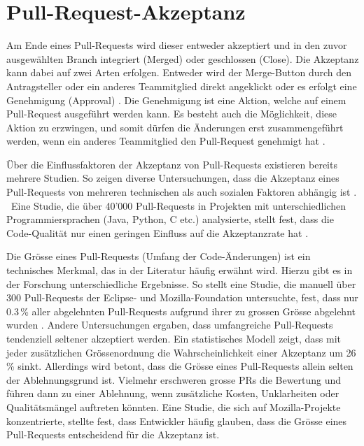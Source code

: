 \section{Pull-Request-Akzeptanz}
Am Ende eines Pull-Requests wird dieser entweder akzeptiert und in den zuvor ausgewählten Branch integriert (Merged) oder geschlossen (Close)\parencite{noauthor_merging_nodate}\parencite{noauthor_closing_nodate}. Die Akzeptanz kann dabei auf zwei Arten erfolgen. Entweder wird der Merge-Button durch den Antragsteller oder ein anderes Teammitglied direkt angeklickt oder es erfolgt eine Genehmigung (Approval) \parencite{noauthor_merging_nodate}\parencite{noauthor_reviewing_nodate}. Die Genehmigung ist eine Aktion, welche auf einem Pull-Request ausgeführt werden kann. Es besteht auch die Möglichkeit, diese Aktion zu erzwingen, und somit dürfen die Änderungen erst zusammengeführt werden, wenn ein anderes Teammitglied den Pull-Request genehmigt hat \parencite{noauthor_approving_nodate}.

Über die Einflussfaktoren der Akzeptanz von Pull-Reque\-sts existieren bereits mehrere Studien.
So zeigen diverse Untersuchungen, dass die Akzeptanz eines Pull-Requests von mehreren technischen als auch sozialen Faktoren abhängig ist \parencite{gousios_exploratory_2014}. \
Eine Studie, die über 40'000 Pull-Requests in Projekten mit unterschiedlichen Programmiersprachen (Java, Python, C etc.) analysierte, stellt fest, dass die Code-Qualität nur einen geringen Einfluss auf die Akzeptanzrate hat \parencite{kuhejda_pull_2023}.

Die Grösse eines Pull-Requests (Umfang der Code-Änderungen) ist ein technisches Merkmal, das in der Literatur häufig erwähnt wird. Hierzu gibt es in der Forschung unterschiedliche Ergebnisse. So stellt eine Studie, die manuell über 300 Pull-Requests der Eclipse- und Mozilla-Foundation untersuchte, fest, dass nur 0.3\,\% aller abgelehnten Pull-Requests aufgrund ihrer zu grossen Grösse abgelehnt wurden \parencite{tao_writing_2014}. Andere Untersuchungen ergaben, dass umfangreiche Pull-Requests tendenziell seltener akzeptiert werden. Ein statistisches Modell zeigt, dass mit jeder zusätzlichen Grössenordnung die Wahrscheinlichkeit einer Akzeptanz um 26\,\% sinkt. Allerdings wird betont, dass die Grösse eines Pull-Re\-quests allein selten der Ablehnungsgrund ist. Vielmehr erschweren grosse PRs die Bewertung und führen dann zu einer Ablehnung, wenn zusätzliche Kosten, Unklarheiten oder Qualitätsmängel auftreten könnten. Eine Studie, die sich auf Mozilla-Projekte konzentrierte, stellte fest, dass Entwickler häufig glauben, dass die Grösse eines Pull-Requests entscheidend für die Akzeptanz ist. \parencite{tsay_influence_2014}

